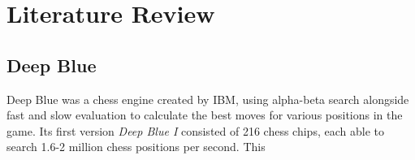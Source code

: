 \chapter{Literature Review}

\section{Deep Blue}
Deep Blue \cite{computerchess} was a chess engine created by IBM, using alpha-beta search alongside fast and slow evaluation to calculate the best moves for various positions in the game. Its first version \emph{Deep Blue I} consisted of 216 chess chips, each able to search 1.6-2 million chess positions per second. This 